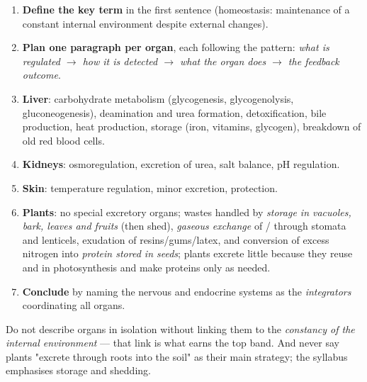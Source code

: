 \documentclass[11pt]{article}
\begin{document}
\begin{methode}
\begin{enumerate}
\item \textbf{Define the key term} in the first sentence (homeostasis: maintenance of a constant internal environment despite external changes).
\item \textbf{Plan one paragraph per organ}, each following the pattern: \emph{what is regulated $\rightarrow$ how it is detected $\rightarrow$ what the organ does $\rightarrow$ the feedback outcome}.
\item \textbf{Liver}: carbohydrate metabolism (glycogenesis, glycogenolysis, gluconeogenesis), deamination and urea formation, detoxification, bile production, heat production, storage (iron, vitamins, glycogen), breakdown of old red blood cells.
\item \textbf{Kidneys}: osmoregulation, excretion of urea, salt balance, pH regulation.
\item \textbf{Skin}: temperature regulation, minor excretion, protection.
\item \textbf{Plants}: no special excretory organs; wastes handled by \emph{storage in vacuoles, bark, leaves and fruits} (then shed), \emph{gaseous exchange} of / through stomata and lenticels, exudation of resins/gums/latex, and conversion of excess nitrogen into \emph{protein stored in seeds}; plants excrete little because they reuse  and  in photosynthesis and make proteins only as needed.
\item \textbf{Conclude} by naming the nervous and endocrine systems as the \emph{integrators} coordinating all organs.
\end{enumerate}
\end{methode}

\begin{attention}
Do not describe organs in isolation without linking them to the \emph{constancy of the internal environment} — that link is what earns the top band. And never say plants "excrete through roots into the soil" as their main strategy; the syllabus emphasises storage and shedding.
\end{attention}
\end{document}
